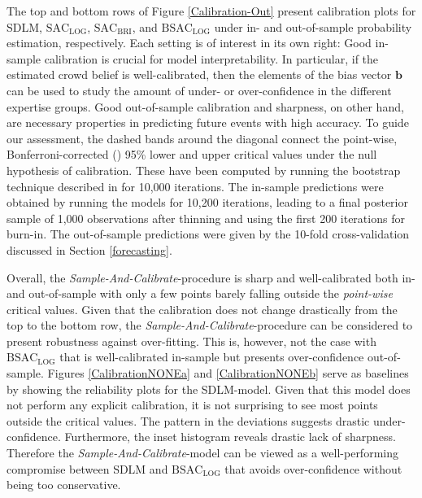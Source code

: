 \documentclass[aoas, preprint]{imsart}
\numberwithin{equation}{section}
\theoremstyle{plain}
\begin{document}
The top and bottom rows of Figure \ref{Calibration-Out} present calibration plots for SDLM, $\text{SAC}_{\text{LOG}}$, $\text{SAC}_{\text{BRI}}$, and $\text{BSAC}_{\text{LOG}}$ under in- and out-of-sample probability estimation, respectively. Each setting is of interest in its own right:  Good in-sample calibration is crucial for model interpretability. In particular, if the estimated crowd belief is well-calibrated, then the elements of the bias vector $\boldsymbol{b}$ can be used to study the amount of under- or over-confidence in the different expertise groups. Good out-of-sample calibration and sharpness, on other hand, are necessary properties in predicting future events with high accuracy.  To guide our assessment, the dashed bands around the diagonal connect the point-wise, Bonferroni-corrected (\citet{bonferroni}) 95\% lower and upper critical values under the null hypothesis of calibration. These have been computed by running the bootstrap technique described in \citet{brocker2007increasing} for 10,000 iterations. The in-sample predictions were obtained by running the models for 10,200 iterations, leading to a final posterior sample of 1,000 observations after thinning and using the first 200 iterations for burn-in. The out-of-sample predictions were given by the 10-fold cross-validation discussed in Section \ref{forecasting}.

Overall, the \textit{Sample-And-Calibrate}-procedure is sharp and well-calibrated both in- and out-of-sample with only a few points barely falling outside the \textit{point-wise} critical values. Given that the calibration does not change drastically from the top to the bottom row, the \textit{Sample-And-Calibrate}-procedure can be considered to present robustness against over-fitting. This is, however, not the case with $\text{BSAC}_{\text{LOG}}$ that is well-calibrated in-sample but presents over-confidence out-of-sample. Figures \ref{CalibrationNONEa} and \ref{CalibrationNONEb} serve as baselines by showing the reliability plots for the SDLM-model. Given that this model does not perform any explicit calibration, it is not surprising to see most points outside the critical values. The pattern in the deviations suggests drastic under-confidence. Furthermore, the inset histogram reveals drastic lack of sharpness. Therefore the \textit{Sample-And-Calibrate}-model can be viewed as a well-performing compromise between SDLM and $\text{BSAC}_{\text{LOG}}$ that avoids over-confidence without being too conservative. 
 
\end{document}
